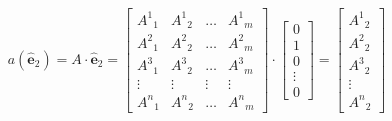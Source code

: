 \documentclass[10pt]{article}
\begin{document}
\[
a\left(\hat{\mathbf{e}}_{2}\right)=A \cdot \hat{\mathbf{e}}_{2}=\left[\begin{array}{cccc}A^{1}{ }_{1} & A^{1}{ }_{2} & \ldots & A^{1}{ }_{m}  \tag{6.48}\\ A^{2}{ }_{1} & A^{2}{ }_{2} & \ldots & A^{2}{ }_{m} \\ A^{3}{ }_{1} & A^{3}{ }_{2} & \ldots & A^{3}{ }_{m} \\ \vdots & \vdots & \vdots & \vdots \\ A^{n}{ }_{1} & A^{n}{ }_{2} & \ldots & A^{n}{ }_{m}\end{array}\right] \cdot\left[\begin{array}{c}0 \\ 1 \\ 0 \\ \vdots \\ 0\end{array}\right]=\left[\begin{array}{c}A^{1}{ }_{2} \\ A^{2}{ }_{2} \\ A^{3}{ }_{2} \\ \vdots \\ A^{n}{ }_{2}\end{array}\right]
\]
\end{document}
